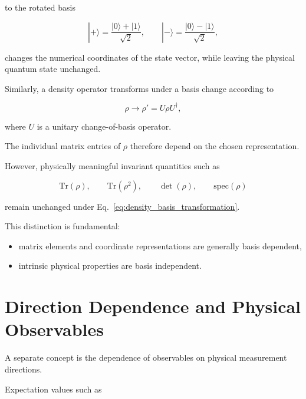 to the rotated basis

\[
|+\rangle
=
\frac{|0\rangle+|1\rangle}{\sqrt{2}},
\qquad
|-\rangle
=
\frac{|0\rangle-|1\rangle}{\sqrt{2}},
\]

changes the numerical coordinates of the state vector, while leaving the physical quantum state unchanged.

\medskip

Similarly, a density operator transforms under a basis change according to

\begin{equation}
\rho
\rightarrow
\rho'
=
U \rho U^\dagger,
\label{eq:density_basis_transformation}
\end{equation}

where \( U \) is a unitary change-of-basis operator.

The individual matrix entries of \( \rho \) therefore depend on the chosen representation.

However, physically meaningful invariant quantities such as

\[
\mathrm{Tr}(\rho),
\qquad
\mathrm{Tr}(\rho^2),
\qquad
\det(\rho),
\qquad
\text{spec}(\rho)
\]

remain unchanged under Eq.~\eqref{eq:density_basis_transformation}.

\medskip

This distinction is fundamental:

\begin{itemize}

\item matrix elements and coordinate representations are generally basis dependent,

\item intrinsic physical properties are basis independent.

\end{itemize}


\section*{Direction Dependence and Physical Observables}

A separate concept is the dependence of observables on physical measurement directions.

Expectation values such as

